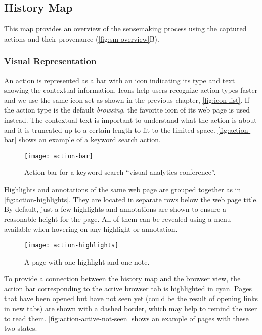 \subsection{History Map}
\label{sub:collection}
This map provides an overview of the sensemaking process using the captured actions and their provenance (\autoref{fig:sm-overview}B).

\subsubsection{Visual Representation}
An action is represented as a bar with an icon indicating its type and text showing the contextual information. Icons help users recognize action types faster and we use the same icon set as shown in the previous chapter, \autoref{fig:icon-list}. If the action type is the default \textit{browsing}, the favorite icon of its web page is used instead. The contextual text is important to understand what the action is about and it is truncated up to a certain length to fit to the limited space. \autoref{fig:action-bar} shows an example of a keyword search action.

\begin{figure}
	\centering
	\texttt{[image: action-bar]}
	\caption{Action bar for a keyword search ``visual analytics conference''.}
	\label{fig:action-bar}
\end{figure}

Highlights and annotations of the same web page are grouped together as in \autoref{fig:action-highlights}. They are located in separate rows below the web page title. By default, just a few highlights and annotations are shown to ensure a reasonable height for the page. All of them can be revealed using a menu available when hovering on any highlight or annotation.

\begin{figure}
	\centering
	\texttt{[image: action-highlights]}
	\caption{A page with one highlight and one note.}
	\label{fig:action-highlights}
\end{figure}

To provide a connection between the history map and the browser view, the action bar corresponding to the active browser tab is highlighted in cyan. Pages that have been opened but have not seen yet (could be the result of opening links in new tabs) are shown with a dashed border, which may help to remind the user to read them. \autoref{fig:action-active-not-seen} shows an example of pages with these two states.

